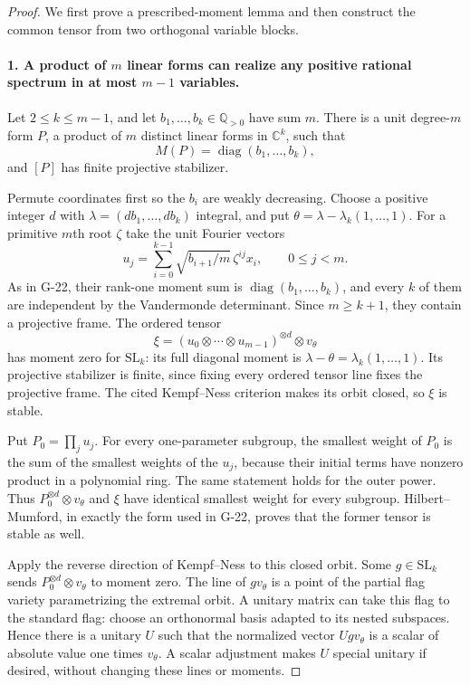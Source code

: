 \begin{proof}
We first prove a prescribed-moment lemma and then construct
the common tensor from two orthogonal variable blocks.

\paragraph{1. A product of $m$ linear forms can realize any positive rational spectrum in at most $m-1$ variables.}
Let $2\leq k\leq m-1$, and let
$b_1,\ldots,b_k\in\mathbb Q_{>0}$ have sum $m$.
There is a unit degree-$m$ form $P$, a product of $m$
distinct linear forms in $\mathbb C^k$, such that
\begin{equation}\label{R29:prescribed_moment}
 M(P)=\operatorname{diag}(b_1,\ldots,b_k),
\end{equation}
and $[P]$ has finite projective stabilizer.

Permute coordinates first so the $b_i$ are weakly decreasing.
Choose a positive integer $d$ with
$\lambda=(db_1,\ldots,db_k)$ integral, and put
$\theta=\lambda-\lambda_k(1,\ldots,1)$.
For a primitive $m$th root $\zeta$ take the unit Fourier
vectors
\[
 u_j=\sum_{i=0}^{k-1}\sqrt{b_{i+1}/m}\,\zeta^{ij}x_i,
       \qquad 0\leq j<m.
\]
As in G-22, their rank-one moment sum is
$\operatorname{diag}(b_1,\ldots,b_k)$, and every $k$ of
them are independent by the Vandermonde determinant.
Since $m\geq k+1$, they contain a projective frame.
The ordered tensor
\[
 \xi=(u_0\otimes\cdots\otimes u_{m-1})^{\otimes d}
                   \otimes v_\theta
\]
has moment zero for $\mathrm{SL}_k$: its full diagonal moment
is $\lambda-\theta=\lambda_k(1,\ldots,1)$.
Its projective stabilizer is finite, since fixing every
ordered tensor line fixes the projective frame. The cited
Kempf--Ness criterion makes its orbit closed, so $\xi$ is
stable.

Put $P_0=\prod_j u_j$. For every one-parameter subgroup,
the smallest weight of $P_0$ is the sum of the smallest
weights of the $u_j$, because their initial terms have
nonzero product in a polynomial ring. The same statement
holds for the outer power. Thus
$P_0^{\otimes d}\otimes v_\theta$ and $\xi$ have identical
smallest weight for every subgroup. Hilbert--Mumford, in
exactly the form used in G-22, proves that the former
tensor is stable as well.

Apply the reverse direction of Kempf--Ness to this closed
orbit. Some $g\in\mathrm{SL}_k$ sends
$P_0^{\otimes d}\otimes v_\theta$ to moment zero.
The line of $g v_\theta$ is a point of the partial flag
variety parametrizing the extremal orbit. A unitary matrix
can take this flag to the standard flag: choose an
orthonormal basis adapted to its nested subspaces. Hence
there is a unitary $U$ such that the normalized vector
$Ugv_\theta$ is a scalar of absolute value one times
$v_\theta$. A scalar adjustment makes $U$ special unitary
if desired, without changing these lines or moments.


\end{proof}
